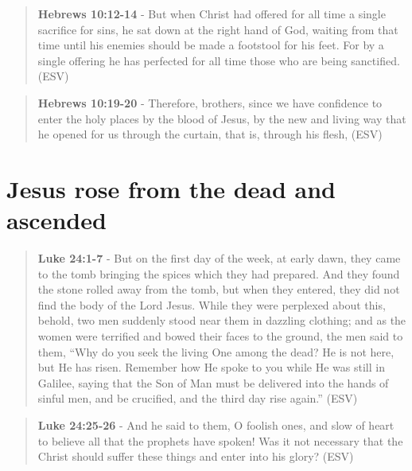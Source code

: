 \documentclass[11pt]{article}
\begin{document}
\begin{quote}
\textbf{Hebrews 10:12-14} - But when Christ had offered for all time a single sacrifice for sins, he sat down at the right hand of God, waiting from that time until his enemies should be made a footstool for his feet. For by a single offering he has perfected for all time those who are being sanctified. (ESV)
\end{quote}

\begin{quote}
\textbf{Hebrews 10:19-20} - Therefore, brothers, since we have confidence to enter the holy places by the blood of Jesus, by the new and living way that he opened for us through the curtain, that is, through his flesh, (ESV)
\end{quote}

\section{Jesus rose from the dead and ascended}
\label{sec:org0d9e21c}
\begin{quote}
\textbf{Luke 24:1-7} - But on the first day of the week, at early dawn, they came to the tomb bringing the spices which they had prepared. And they found the stone rolled away from the tomb, but when they entered, they did not find the body of the Lord Jesus. While they were perplexed about this, behold, two men suddenly stood near them in dazzling clothing; and as the women were terrified and bowed their faces to the ground, the men said to them, “Why do you seek the living One among the dead? He is not here, but He has risen. Remember how He spoke to you while He was still in Galilee, saying that the Son of Man must be delivered into the hands of sinful men, and be crucified, and the third day rise again.” (ESV)
\end{quote}

\begin{quote}
\textbf{Luke 24:25-26} - And he said to them, O foolish ones, and slow of heart to believe all that the prophets have spoken! Was it not necessary that the Christ should suffer these things and enter into his glory? (ESV)
\end{quote}
\end{document}

